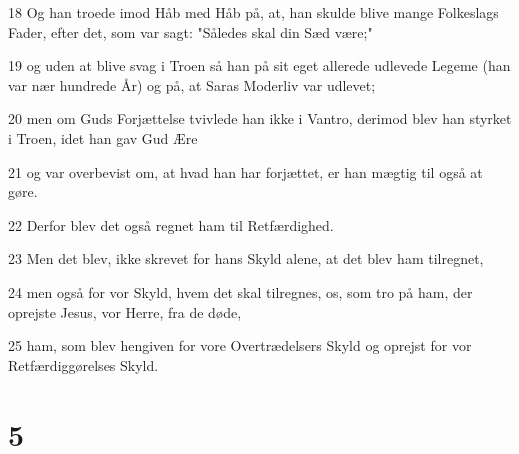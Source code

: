 \par 18 Og han troede imod Håb med Håb på, at, han skulde blive mange Folkeslags Fader, efter det, som var sagt: "Således skal din Sæd være;"
\par 19 og uden at blive svag i Troen så han på sit eget allerede udlevede Legeme (han var nær hundrede År) og på, at Saras Moderliv var udlevet;
\par 20 men om Guds Forjættelse tvivlede han ikke i Vantro, derimod blev han styrket i Troen, idet han gav Gud Ære
\par 21 og var overbevist om, at hvad han har forjættet, er han mægtig til også at gøre.
\par 22 Derfor blev det også regnet ham til Retfærdighed.
\par 23 Men det blev, ikke skrevet for hans Skyld alene, at det blev ham tilregnet,
\par 24 men også for vor Skyld, hvem det skal tilregnes, os, som tro på ham, der oprejste Jesus, vor Herre, fra de døde,
\par 25 ham, som blev hengiven for vore Overtrædelsers Skyld og oprejst for vor Retfærdiggørelses Skyld.

\chapter{5}

